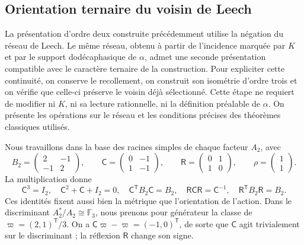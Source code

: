 
\subsection{Orientation ternaire du voisin de Leech}
\label{km:orden-tres-reticular}

La présentation d'ordre deux construite précédemment utilise la négation
du réseau de Leech. Le même réseau, obtenu à partir de l'incidence marquée
par \(K\) et par le support dodécaphasique de \(\alpha\), admet une seconde
présentation compatible avec le caractère ternaire de la construction.
Pour expliciter cette continuité, on conserve le recollement, on construit
son isométrie d'ordre trois et on vérifie que celle-ci préserve le voisin déjà
sélectionné. Cette étape ne requiert de modifier ni \(K\), ni sa lecture rationnelle, ni
la définition préalable de \(\alpha\). On présente les opérations sur le réseau et les conditions précises
des théorèmes classiques utilisés.

Nous travaillons dans la base des racines simples de chaque facteur \(A_2\), avec
\begin{equation}
 B_2=\begin{pmatrix}2&-1\\-1&2\end{pmatrix},\qquad
 \mathsf C=\begin{pmatrix}0&-1\\1&-1\end{pmatrix},\qquad
 \mathsf R=\begin{pmatrix}0&1\\1&0\end{pmatrix},\qquad
 \rho=\begin{pmatrix}1\\1\end{pmatrix}.
 \label{km:coxeter-reflexion}
\end{equation}
La multiplication donne
\[
 \mathsf C^3=I_2,\quad
 \mathsf C^2+\mathsf C+I_2=0,\quad
 \mathsf C^{\mathsf T}B_2\mathsf C=B_2,\quad
 \mathsf R\mathsf C\mathsf R=\mathsf C^{-1},\quad
 \mathsf R^{\mathsf T}B_2\mathsf R=B_2.
\]
Ces identités fixent aussi bien la métrique que l'orientation de l'action. Dans le discriminant \(A_2^*/A_2\cong\mathbb F_3\), nous prenons pour générateur la classe de \(\varpi=(2,1)^{\mathsf T}/3\). On a \(\mathsf C\varpi-\varpi=(-1,0)^{\mathsf T}\), de sorte que \(\mathsf C\) agit trivialement sur le discriminant ; la réflexion \(\mathsf R\) change son signe.

